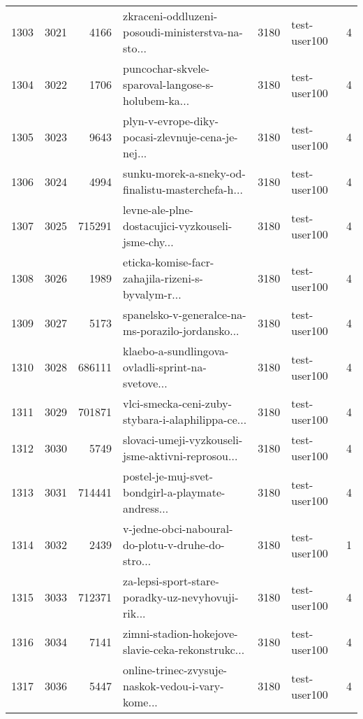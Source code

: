 \begin{tabular}{lrrlrlr}
1303 &       3021 &     4166 &  zkraceni-oddluzeni-posoudi-ministerstva-na-sto... &     3180 &                 test-user100 &               4 \\
1304 &       3022 &     1706 &  puncochar-skvele-sparoval-langose-s-holubem-ka... &     3180 &                 test-user100 &               4 \\
1305 &       3023 &     9643 &  plyn-v-evrope-diky-pocasi-zlevnuje-cena-je-nej... &     3180 &                 test-user100 &               4 \\
1306 &       3024 &     4994 &  sunku-morek-a-sneky-od-finalistu-masterchefa-h... &     3180 &                 test-user100 &               4 \\
1307 &       3025 &   715291 &  levne-ale-plne-dostacujici-vyzkouseli-jsme-chy... &     3180 &                 test-user100 &               4 \\
1308 &       3026 &     1989 &  eticka-komise-facr-zahajila-rizeni-s-byvalym-r... &     3180 &                 test-user100 &               4 \\
1309 &       3027 &     5173 &  spanelsko-v-generalce-na-ms-porazilo-jordansko... &     3180 &                 test-user100 &               4 \\
1310 &       3028 &   686111 &  klaebo-a-sundlingova-ovladli-sprint-na-svetove... &     3180 &                 test-user100 &               4 \\
1311 &       3029 &   701871 &  vlci-smecka-ceni-zuby-stybara-i-alaphilippa-ce... &     3180 &                 test-user100 &               4 \\
1312 &       3030 &     5749 &  slovaci-umeji-vyzkouseli-jsme-aktivni-reprosou... &     3180 &                 test-user100 &               4 \\
1313 &       3031 &   714441 &  postel-je-muj-svet-bondgirl-a-playmate-andress... &     3180 &                 test-user100 &               4 \\
1314 &       3032 &     2439 &  v-jedne-obci-naboural-do-plotu-v-druhe-do-stro... &     3180 &                 test-user100 &               1 \\
1315 &       3033 &   712371 &  za-lepsi-sport-stare-poradky-uz-nevyhovuji-rik... &     3180 &                 test-user100 &               4 \\
1316 &       3034 &     7141 &  zimni-stadion-hokejove-slavie-ceka-rekonstrukc... &     3180 &                 test-user100 &               4 \\
1317 &       3036 &     5447 &  online-trinec-zvysuje-naskok-vedou-i-vary-kome... &     3180 &                 test-user100 &               4 \\

\end{tabular}
